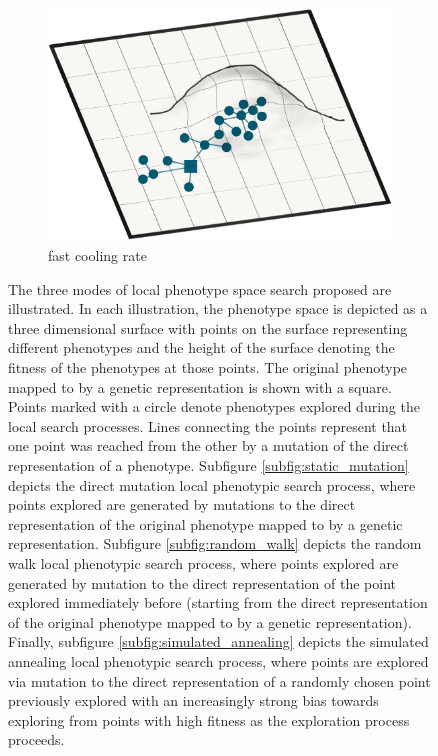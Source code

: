 \begin{figure}[!htbp]
\begin{subfigure}[b]{0.5\textwidth}
        \includegraphics[width=\textwidth]{img/fast_cooling.png}
        \caption{fast cooling rate}
        \label{subfig:fast_cooling}
    \end{subfigure}
 	\captionsetup{singlelinecheck=off,justification=raggedright}
    \vspace{-2ex}
  \captionsetup{singlelinecheck=off,justification=raggedright}
  \caption{The three modes of local phenotype space search proposed are illustrated. In each illustration, the phenotype space is depicted as a three dimensional surface with points on the surface representing different phenotypes and the height of the surface denoting the fitness of the phenotypes at those points. The original phenotype mapped to by a genetic representation is shown with a square. Points marked with a circle denote phenotypes explored during the local search processes. Lines connecting the points represent that one point was reached from the other by a mutation of the direct representation of a phenotype. Subfigure \ref{subfig:static_mutation} depicts the direct mutation local phenotypic search process, where points explored are generated by mutations to the direct representation of the original phenotype mapped to by a genetic representation. Subfigure \ref{subfig:random_walk} depicts the random walk local phenotypic search process, where points explored are generated by mutation to the direct representation of the point explored immediately before (starting from the direct representation of the original phenotype mapped to by a genetic representation). Finally, subfigure \ref{subfig:simulated_annealing} depicts the simulated annealing local phenotypic search process, where points are explored via mutation to the direct representation of a randomly chosen point previously explored with an increasingly strong bias towards exploring from points with high fitness as the exploration process proceeds.}
  \label{fig:local_search_types}
\end{figure}